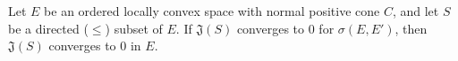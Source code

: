 Let $E$ be an ordered locally convex space with normal positive cone $C$, and let $S$ be a directed ($\leq$) subset of $E$. If $\mathfrak{J}(S)$ converges to $0$ for $\sigma(E, E')$, then $\mathfrak{J}(S)$ converges to $0$ in $E$.
